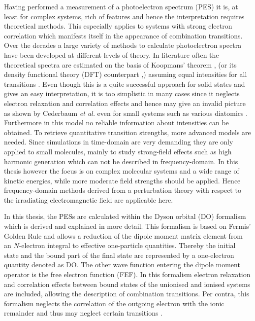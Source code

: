 Having performed a measurement of a photoelectron spectrum (PES) it is, at least for complex systems, rich of features and hence the interpretation requires theoretical methods.
This especially applies to systems with strong electron correlation which manifests itself in the appearance of combination transitions.
Over the decades a large variety of methods to calculate photoelectron spectra have been developed at different levels of theory.
In literature often the theoretical spectra are estimated on the basis of Koopmans' theorem \cite{koopmans}, (or its density functional theory (DFT) counterpart \cite{koopmansDFT},) assuming equal intensities for all transitions \cite{OT-RSH,Koerzd1,Koerzd2,Gao_wopperer}.
Even though this is a quite successful approach for solid states \cite{Solid2,Leckey1992} and gives an easy interpretation, it is too simplistic in many cases since it neglects electron relaxation and correlation effects and hence may give an invalid picture as shown by Cederbaum \textit{et al.} even for small systems such as various diatomics \cite{2phcederbaum2, cederbaumN2}.
Furthermore in this model no reliable information about intensities can be obtained.
To retrieve quantitative  transition strengths, more advanced models are needed.
Since simulations in time-domain are very demanding  they are only applied to small molecules, mainly to study strong-field effects such as high harmonic generation \cite{H2pDeCleva,as2,hhg, zhangHHG,dromey_HHG} which can not be described in frequency-domain.
In this thesis however the focus is on complex molecular systems and a wide range of kinetic energies, while more moderate field strengths should be applied.
Hence frequency-domain methods derived from a perturbation theory with respect to the irradiating electromagnetic field are applicable here.

In this thesis, the PESs are calculated within the Dyson orbital (DO) formalism which is derived and explained in more detail.
This formalism is based on Fermis' Golden Rule \cite{fgr} and allows a reduction of the dipole moment matrix element from an $N$-electron integral to effective one-particle quantities. %
Thereby the initial state and the bound part of the final state are represented by a one-electron quantity denoted as DO.
The other wave function entering the dipole moment operator is the free electron function (FEF).
In this formalism electron relaxation and correlation effects between bound states of the unionised and ionised systems are included, allowing the description of combination transitions.
Per contra, this formalism neglects the correlation of the outgoing electron with the ionic remainder and thus may neglect certain transitions \cite{LiSonntag}.

